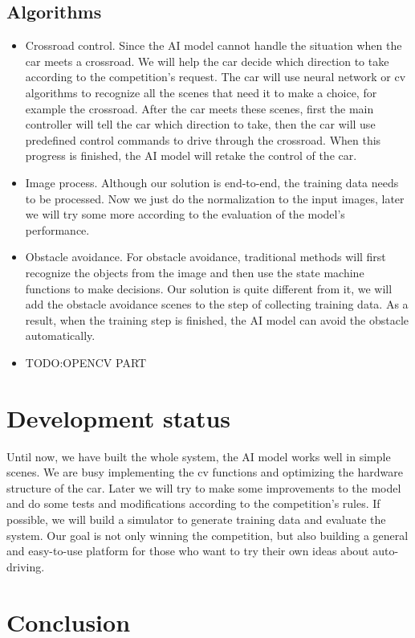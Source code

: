 \documentclass[conference]{IEEEtran}
\begin{document}
\subsection{Algorithms}
\begin{itemize}
\item Crossroad control. Since the AI model cannot handle the situation when the car meets a crossroad. We will help the car decide which direction to take according to the competition's request. The car will use neural network or cv algorithms to recognize all the scenes that need it to make a choice, for example the crossroad. After the car meets these scenes, first the main controller will tell the car which direction to take, then the car will use predefined control commands to drive through the crossroad. When this progress is finished, the AI model will retake the control of the car.
\item Image process. Although our solution is end-to-end, the training data needs to be processed. Now we just do the normalization to the input images, later we will try some more according to the evaluation of the model's performance.
\item Obstacle avoidance. For obstacle avoidance, traditional methods will first recognize the objects from the image and then use the state machine functions to make decisions. Our solution is quite different from it, we will add the obstacle avoidance scenes to the step of collecting training data. As a result, when the training step is finished, the AI model can avoid the obstacle automatically.
\item TODO:OPENCV PART
\end{itemize}

\section{Development status}

Until now, we have built the whole system, the AI model works well in simple scenes. We are busy implementing the cv functions and optimizing the hardware structure of the car. Later we will try to make some improvements to the model and do some tests and modifications according to the competition's rules. If possible, we will build a simulator to generate training data and evaluate the system. Our goal is not only winning the competition, but also building a general and easy-to-use platform for those who want to try their own ideas about auto-driving.

\section{Conclusion}
\end{document}

